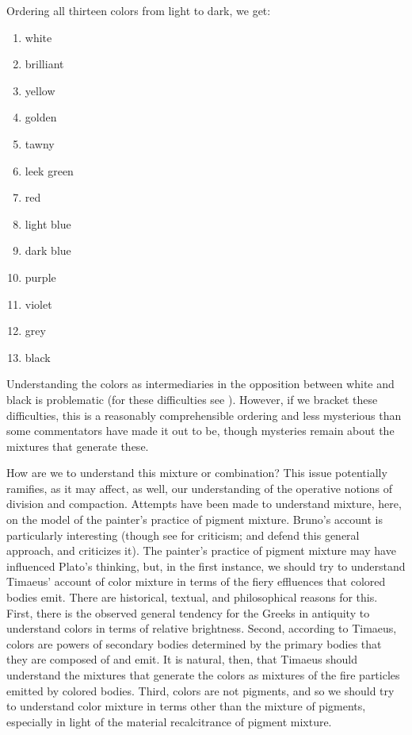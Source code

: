 Ordering all thirteen colors from light to dark, we get:
\begin{enumerate}
	\item white
	\item brilliant
	\item yellow
	\item golden
	\item tawny
	\item leek green
	\item red
	\item light blue
	\item dark blue
	\item purple
	\item violet
	\item grey
	\item black
\end{enumerate}
Understanding the colors as intermediaries in the opposition between white and black is problematic (for these difficulties see \citealt[chapter 6.3]{Kalderon:2015fr}). However, if we bracket these difficulties, this is a reasonably comprehensible ordering and less mysterious than some commentators have made it out to be, though mysteries remain about the mixtures that generate these.

How are we to understand this mixture or combination? This issue potentially ramifies, as it may affect, as well, our understanding of the operative notions of division and compaction. Attempts have been made to understand mixture, here, on the model of the painter's practice of pigment mixture. Bruno's \citeyearpar[chapter 10]{Bruno:1977fk} account is particularly interesting (though see \citealt[]{Gage:1993aa} for criticism; \citealt[278]{Cornford:1935fk} and \citealt{Levides:2002aa} defend this general approach, and \citealt{Struycken:2003zr} criticizes it). The painter's practice of pigment mixture may have influenced Plato's thinking, but, in the first instance, we should try to understand Timaeus' account of color mixture in terms of the fiery effluences that colored bodies emit. There are historical, textual, and philosophical reasons for this. First, there is the observed general tendency for the Greeks in antiquity to understand colors in terms of relative brightness. Second, according to Timaeus, colors are powers of secondary bodies determined by the primary bodies that they are composed of and emit. It is natural, then, that Timaeus should understand the mixtures that generate the colors as mixtures of the fire particles emitted by colored bodies. Third, colors are not pigments, and so we should try to understand color mixture in terms other than the mixture of pigments, especially in light of the material recalcitrance of pigment mixture.

